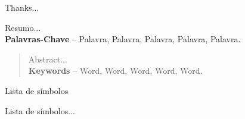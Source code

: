 \documentclass[]{politex}
\begin{document}
\capa
\falsafolhaderosto
\folhaderosto








\begin{agradecimentos}

Thanks...

\end{agradecimentos}




\begin{resumo}
Resumo...
%
\\[3\baselineskip]
%
\textbf{Palavras-Chave} -- Palavra, Palavra, Palavra, Palavra, Palavra.
\end{resumo}


\begin{abstract}
Abstract...
%
\\[3\baselineskip]
%
\textbf{Keywords} -- Word, Word, Word, Word, Word.
\end{abstract}


\listadefiguras
\listadetabelas

\begin{pretextualsection}{Lista de símbolos}

Lista de símbolos...

\end{pretextualsection}

\sumario



\end{document}
